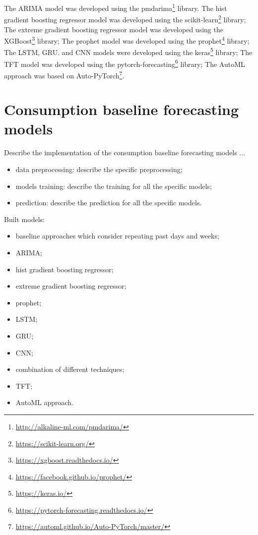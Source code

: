 The ARIMA model was developed using the pmdarima\footnote{ \url{http://alkaline-ml.com/pmdarima/} } library.
The hist gradient boosting regressor model was developed using the scikit-learn\footnote{ \url{https://scikit-learn.org/} } library;
The extreme gradient boosting regressor model was developed using the XGBoost\footnote{ \url{https://xgboost.readthedocs.io/} } library;
The prophet model was developed using the prophet\footnote{ \url{https://facebook.github.io/prophet/} } library;
The LSTM, GRU. and CNN models were developed using the keras\footnote{ \url{https://keras.io/} } library;
The TFT model was developed using the pytorch-forecasting\footnote{ \url{https://pytorch-forecasting.readthedocs.io/} } library;
The AutoML approach was based on Auto-PyTorch\footnote{ \url{https://automl.github.io/Auto-PyTorch/master/} }.


\section{Consumption baseline forecasting models}
\label{sec:baselineimpl}
\vspace{0.2 cm}

Describe the implementation of the consumption baseline forecasting models ...
\begin{itemize}
  \item data preprocessing: describe the specific preprocessing;
  \item models training: describe the training for all the specific models;
  \item prediction: describe the prediction for all the specific models.
\end{itemize}

Built models:
\begin{itemize}
  \item baseline approaches which consider repeating past days and weeks;
  \item ARIMA;
  \item hist gradient boosting regressor;
  \item extreme gradient boosting regressor;
  \item prophet;
  \item LSTM;
  \item GRU;
  \item CNN;
  \item combination of different techniques;
  \item TFT;
  \item AutoML approach.
\end{itemize}

